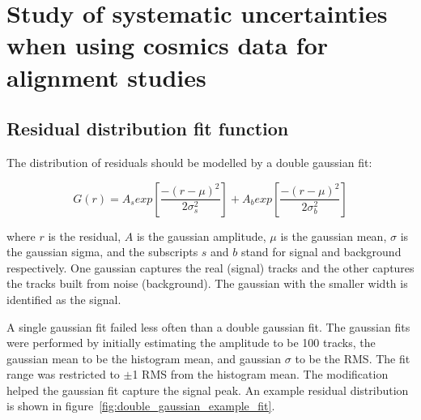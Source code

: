 

\chapter[Analysis systematics]{Study of systematic uncertainties when using cosmics data for alignment studies}
\label{appendix:systematics}


\section{Residual distribution fit function}
\label{appendix:systematics_res_fit_fcn}


The distribution of residuals should be modelled by a double gaussian fit\cite{lefebvre_thesis}:

\begin{equation}
\label{eqn:doub_gaus}
G(r) = A_{s}exp\left[ \frac{-(r-\mu)^{2}}{2\sigma_s^{2}} \right] + A_{b}exp\left[ \frac{-(r-\mu)^{2}}{2\sigma_b^{2}} \right]
\end{equation}

where $r$ is the residual, $A$ is the gaussian amplitude, $\mu$ is the gaussian mean, $\sigma$ is the gaussian sigma, and the subscripts $s$ and $b$ stand for signal and background respectively. One gaussian captures the real (signal) tracks and the other captures the tracks built from noise (background). The gaussian with the smaller width is identified as the signal. 

A single gaussian fit failed less often than a double gaussian fit. The gaussian fits were performed by initially estimating the amplitude to be 100 tracks, the gaussian mean to be the histogram mean, and gaussian $\sigma$ to be the RMS. The fit range was restricted to $\pm$1 RMS from the histogram mean. The modification helped the gaussian fit capture the signal peak. An example residual distribution is shown in figure~\ref{fig:double_gaussian_example_fit}. 


